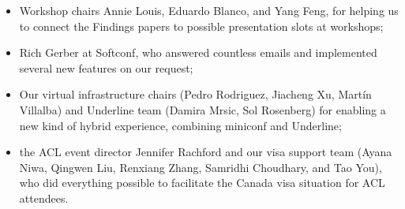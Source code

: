 \begin{itemize}
\item Workshop chairs Annie Louis, Eduardo Blanco, and Yang Feng, for helping us to connect the Findings papers to possible presentation slots at workshops;
\item Rich Gerber at Softconf, who answered countless emails and implemented several new features on our request;
\item Our virtual infrastructure chairs (Pedro Rodriguez, Jiacheng Xu, Martín Villalba) and Underline team (Damira Mrsic, Sol Rosenberg) for enabling a new kind of hybrid experience, combining miniconf and Underline;
\item the ACL event director Jennifer Rachford and our visa support team (Ayana Niwa, Qingwen Liu, Renxiang Zhang, Samridhi Choudhary, and Tao You), who did everything possible to facilitate the Canada visa situation for ACL attendees.
\end{itemize}



